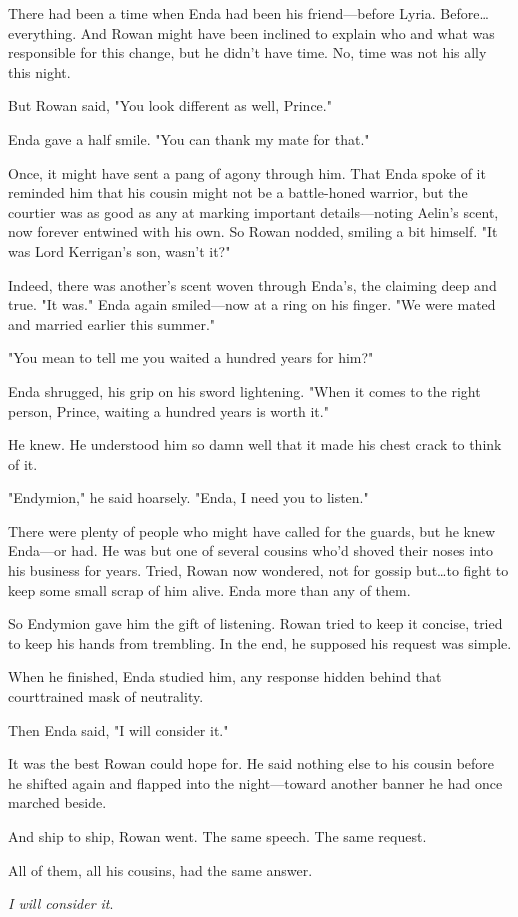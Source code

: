 There had been a time when Enda had been his friend---before Lyria.
Before\ldots everything.
And Rowan might have been inclined to explain who and what was responsible for this change, but he didn't have time.
No, time was not his ally this night.

But Rowan said, "You look different as well, Prince."

Enda gave a half smile.
"You can thank my mate for that."

Once, it might have sent a pang of agony through him.
That Enda spoke of it reminded him that his cousin might not be a battle-honed warrior, but the courtier was as good as any at marking important details---noting Aelin's scent, now forever entwined with his own.
So Rowan nodded, smiling a bit himself.
"It was Lord Kerrigan's son, wasn't it?"

Indeed, there was another's scent woven through Enda's, the claiming deep and true.
"It was."
Enda again smiled---now at a ring on his finger.
"We were mated and married earlier this summer."

"You mean to tell me you waited a hundred years for him?"

Enda shrugged, his grip on his sword lightening.
"When it comes to the right person, Prince, waiting a hundred years is worth it."

He knew.
He understood him so damn well that it made his chest crack to think of it.

"Endymion," he said hoarsely.
"Enda, I need you to listen."

There were plenty of people who might have called for the guards, but he knew Enda---or had.
He was but one of several cousins who'd shoved their noses into his business for years.
Tried, Rowan now wondered, not for gossip but\ldots to fight to keep some small scrap of him alive.
Enda more than any of them.

So Endymion gave him the gift of listening.
Rowan tried to keep it concise, tried to keep his hands from trembling.
In the end, he supposed his request was simple.

When he finished, Enda studied him, any response hidden behind that courttrained mask of neutrality.

Then Enda said, "I will consider it."

It was the best Rowan could hope for.
He said nothing else to his cousin before he shifted again and flapped into the night---toward another banner he had once marched beside.

And ship to ship, Rowan went.
The same speech.
The same request.

All of them, all his cousins, had the same answer.

\emph{I will consider it}.
